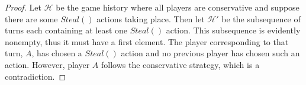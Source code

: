 \begin{proof}
  Let $\mathcal{H}$ be the game history where all players are conservative and suppose there are some
  $Steal\left(\right)$ actions taking place. Then let $\mathcal{H}'$ be the subsequence of turns each containing at
  least one $Steal\left(\right)$ action. This subsequence is evidently nonempty, thus it must have a first element. The
  player corresponding to that turn, $A$, has chosen a $Steal\left(\right)$ action and no previous player has chosen
  such an action. However, player $A$ follows the conservative strategy, which is a contradiction.
\end{proof}
